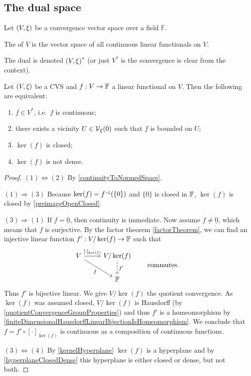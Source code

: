 \subsection{The dual space}
\begin{definition}
Let $\sSet{V,\xi}$ be a convergence vector space over a field $\mathbb{F}$.

The  of $V$ is the vector space of all continuous linear functionals on $V$.

The dual is denoted $\sSet{V,\xi}^{*}$ (or just $V^*$ is the convergence is clear from the context).
\end{definition}

\begin{proposition} \label{continuityLinearFunctionals}
Let $\sSet{V, \xi}$ be a CVS and $f:V\to \mathbb{F}$ a linear functional on $V$. Then the following are equivalent:
\begin{enumerate}
\item $f\in V^{*}$, i.e.\ $f$ is continuous;
\item there exists a vicinity $U\in \operatorname{\mathcal{V}}_\xi(0)$ such that $f$ is bounded on $U$;
\item $\ker(f)$ is closed;
\item $\ker(f)$ is not dense.
\end{enumerate}
\end{proposition}
\begin{proof}
$(1) \Leftrightarrow (2)$ By \ref{continuityToNormedSpace}.

$(1) \Rightarrow (3)$ Because $\ker(f) = f^{{\text{\hspace{0.15em}-}\downarrow}}(\{0\})$ and $\{0\}$ is closed in $\mathbb{F}$, $\ker(f)$ is closed by \ref{preimageOpenClosed}.

$(3) \Rightarrow (1)$ If $f = \underline{0}$, then continuity is immediate. Now assume $f \neq \underline{0}$, which means that $f$ is surjective. By the factor theorem \ref{factorTheorem}, we can find an injective linear function $f': V/\ker(f)\to \mathbb{F}$ such that
\[ \begin{tikzcd}
V \arrow[r, "{[\cdot]_{\ker(f)}}"] \arrow[dr, swap, "f"] & V/\ker(f) \arrow[d, dashed, "{f'}"] \\
& \F
\end{tikzcd} \qquad\text{commutes.} \]
Thus $f'$ is bijective linear. We give $V/\ker(f)$ the quotient convergence. As $\ker(f)$ was assumed closed, $V/\ker(f)$ is Hausdorff (by \ref{quotientConvergenceGroupProperties}) and thus $f'$ is a homeomorphism by \ref{finiteDimensionalHausdorffLinearBijectionIsHomeomorphism}. We conclude that $f= f'\circ [\cdot]_{\ker(f)}$ is continuous as a composition of continuous functions.

$(3) \Leftrightarrow (4)$ By \ref{kernelHyperplane} $\ker(f)$ is a hyperplane and by \ref{hyperplaneClosedDense} this hyperplane is either closed or dense, but not both.
\end{proof}

